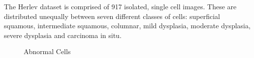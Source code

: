 \documentclass[ms,electronic,oneside,twosidetoc,letterpaper,chaptercenter,parttop]{byumsphd}
\begin{document}
The Herlev dataset is comprised of 917 isolated, single cell images. These are distributed unequally between seven different classes of cells: superficial squamous, intermediate squamous, columnar, mild dysplasia, moderate dysplasia, severe dysplasia and carcinoma in situ.\cite{herlev}

\begin{figure}[H]
  \centering
   \quad
   \quad
   \quad
  \caption{Abnormal Cells}
\end{figure}
\end{document}

